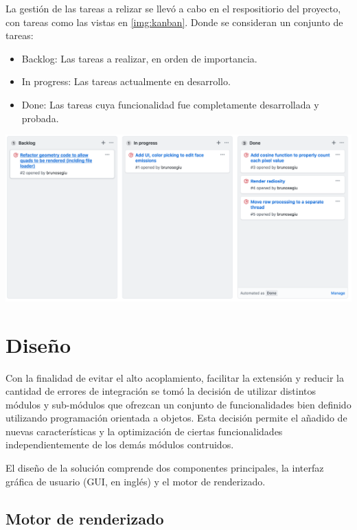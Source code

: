 La gestión de las tareas a relizar se llevó a cabo en el respositiorio del proyecto, con tareas como las vistas en \ref{img:kanban}. Donde se consideran un conjunto de tareas:

\begin{itemize}
	\item Backlog: Las tareas a realizar, en orden de importancia.
	\item In progress: Las tareas actualmente en desarrollo.
	\item Done: Las tareas cuya funcionalidad fue completamente desarrollada y probada.
\end{itemize}

\vspace{5mm}
\begin{minipage}[h]{0.8\linewidth}
	\centering
	\includegraphics[width=\linewidth]{assets/kanban}
	\label{img:kanban}
\end{minipage}

\section{Diseño}
\label{sec:disenio}

Con la finalidad de evitar el alto acoplamiento, facilitar la extensión y reducir la cantidad de errores de integración se tomó la decisión de utilizar distintos módulos y sub-módulos que ofrezcan un conjunto de funcionalidades bien definido utilizando programación orientada a objetos. Esta decisión permite el añadido de nuevas características y la optimización de ciertas funcionalidades independientemente de los demás módulos contruidos.

El diseño de la solución comprende dos componentes principales, la interfaz gráfica de usuario (GUI, en inglés) y el motor de renderizado.

\subsection{Motor de renderizado}
\label{sec:engine}


